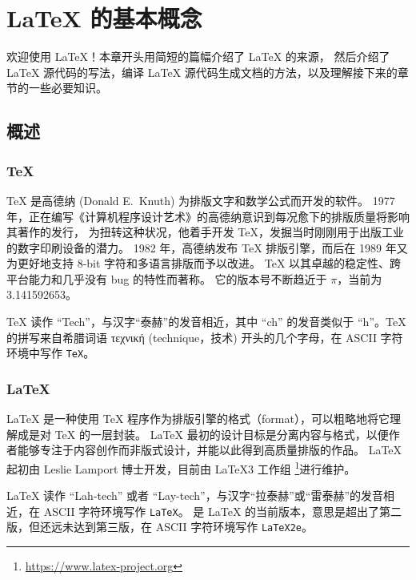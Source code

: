 \chapter{\LaTeX{} 的基本概念}\label{chap:basics}

\begin{intro}
欢迎使用 \LaTeX{}！本章开头用简短的篇幅介绍了 \LaTeX{} 的来源，
然后介绍了 \LaTeX{} 源代码的写法，编译 \LaTeX{} 源代码生成文档的方法，以及理解接下来的章节的一些必要知识。
\end{intro}

\section{概述}\label{sec:intro}

\subsection{\protect\TeX}\label{subsec:tex}

\TeX{} 是高德纳 (Donald E.~Knuth) 为排版文字和数学公式而开发的软件\cite{texbook}。
1977 年，正在编写《计算机程序设计艺术》的高德纳意识到每况愈下的排版质量将影响其著作的发行，
为扭转这种状况，他着手开发 \TeX{}，发掘当时刚刚用于出版工业的数字印刷设备的潜力。
1982 年，高德纳发布 \TeX{} 排版引擎，而后在 1989 年又为更好地支持 8-bit 字符和多语言排版而予以改进。
\TeX{} 以其卓越的稳定性、跨平台能力和几乎没有 bug 的特性而著称。
它的版本号不断趋近于 $\pi$，当前为 3.141592653。

\TeX{} 读作 ``Tech''，与汉字“泰赫”的发音相近，其中 ``ch'' 的发音类似于 ``h''。\TeX{} 的拼写来自希腊词语
τεχνική (technique，技术) 开头的几个字母，在 ASCII 字符环境中写作 \texttt{TeX}。

\subsection{\LaTeX}\label{subsec:latex}

\LaTeX{} 是一种使用 \TeX{} 程序作为排版引擎的格式（format），可以粗略地将它理解成是对 \TeX{} 的一层封装。
\LaTeX{} 最初的设计目标是分离内容与格式，以便作者能够专注于内容创作而非版式设计，并能以此得到高质量排版的作品。
\LaTeX{} 起初由 Leslie Lamport 博士\cite{manual}开发，目前由 \LaTeX 3 工作组%
\footnote{\url{https://www.latex-project.org}}进行维护。

\LaTeX{} 读作 ``Lah-tech'' 或者 ``Lay-tech''，与汉字“拉泰赫”或“雷泰赫”的发音相近，在 ASCII 字符环境写作 \texttt{LaTeX}。
\LaTeXe{} 是 \LaTeX{} 的当前版本，意思是超出了第二版，但还远未达到第三版，在 ASCII 字符环境写作 \texttt{LaTeX2e}。

